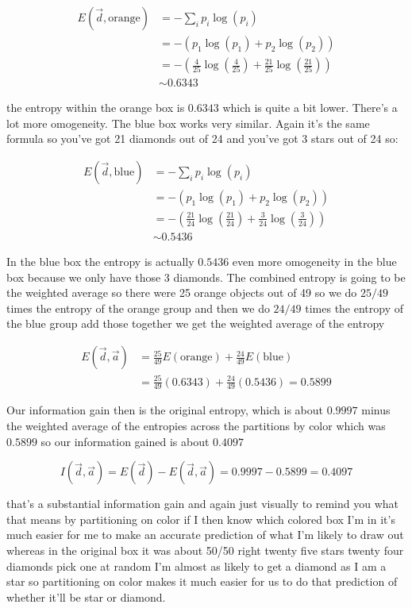 \documentclass{article}
\begin{document}
\begin{align*} 
E(\vec d, \text{orange}) &= -\sum_i p_i \log(p_i) \\ &=-(p_1 \log(p_1) + p_2 \log(p_2)) \\ &=-\left(\frac{4}{25}\log\left(\frac{4}{25}\right) + \frac{21}{25} \log\left(\frac{21}{25}\right)\right) \\ &\sim 0.6343 
\end{align*}

the entropy within the orange box is \(0.6343\) which is quite a bit
lower. There's a lot more omogeneity. The blue box works very similar.
Again it's the same formula so you've got 21 diamonds out of 24 and
you've got 3 stars out of 24 so:

\begin{align*} 
E(\vec d, \text{blue}) &= -\sum_i p_i \log(p_i) \\ &=-(p_1 \log(p_1) + p_2 \log(p_2)) \\ &=-\left(\frac{21}{24}\log\left(\frac{21}{24}\right) + \frac{3}{24} \log\left(\frac{3}{24}\right)\right) \\ &\sim 0.5436 
\end{align*}

In the blue box the entropy is actually \(0.5436\) even more omogeneity
in the blue box because we only have those 3 diamonds. The combined
entropy is going to be the weighted average so there were 25 orange
objects out of 49 so we do \(25/49\) times the entropy of the orange
group and then we do \(24/49\) times the entropy of the blue group add
those together we get the weighted average of the entropy

\begin{align*} 
E(\vec d, \vec a) &= \frac{25}{49} E(\text{orange}) + \frac{24}{49} E(\text{blue}) \\ &= \frac{25}{49} (0.6343) + \frac{24}{49} (0.5436) = 0.5899 
\end{align*}

    

    Our information gain then is the original entropy, which is about
\(0.9997\) minus the weighted average of the entropies across the
partitions by color which was \(0.5899\) so our information gained is
about \(0.4097\)

\[ I(\vec d, \vec a) = E(\vec d) - E(\vec d, \vec a) = 0.9997 - 0.5899 = 0.4097 \]

that's a substantial information gain and again just visually to remind
you what that means by partitioning on color if I then know which
colored box I'm in it's much easier for me to make an accurate
prediction of what I'm likely to draw out whereas in the original box it
was about 50/50 right twenty five stars twenty four diamonds pick one at
random I'm almost as likely to get a diamond as I am a star so
partitioning on color makes it much easier for us to do that prediction
of whether it'll be star or diamond.
\end{document}
